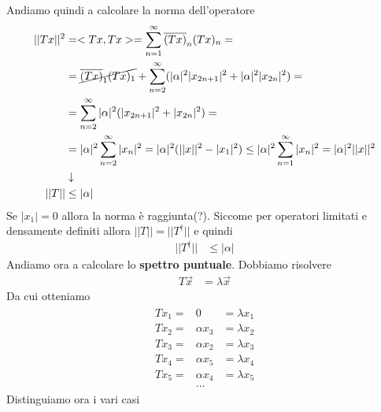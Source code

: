 Andiamo quindi a calcolare la norma dell'operatore
\begin{align}
	||Tx||^2 &= <Tx,Tx> = \sum_{n=1}^{\infty} \overline{(Tx)}_n (Tx)_n = \nonumber\\
	&=\cancel{\overline{(Tx)}_1 (Tx)_1} + \sum_{n=2}^{\infty} (|\alpha|^2 |x_{2n+1}|^2 + |\alpha|^2 |x_{2n}|^2) = \nonumber\\
	&=\sum_{n=2}^{\infty} |\alpha|^2( |x_{2n+1}|^2 + |x_{2n}|^2) = \nonumber\\
	&=|\alpha|^2 \sum_{n=2}^{\infty} |x_{n}|^2 =|\alpha|^2( ||x||^2 - |x_1|^2) \leq |\alpha|^2 \sum_{n=1}^{\infty} |x_{n}|^2 = |\alpha|^2 ||x||^2 \\ &\downarrow \nonumber \\
	||T|| &\leq |\alpha|	
\end{align}
Se $|x_1|=0$ allora la norma è raggiunta(?).
Siccome per operatori limitati e densamente definiti allora $||T|| = ||T^\dagger||$ e quindi 
\begin{align}
	||T^\dagger|| &\leq |\alpha|	
\end{align}
Andiamo ora a calcolare lo \textbf{spettro puntuale}. Dobbiamo risolvere
\begin{align}
	T\vec{x} &= \lambda \vec{x}	
\end{align}
Da cui otteniamo
\begin{align}
	\begin{matrix}
		Tx_1 =& 0 &= \lambda x_1 \\
		Tx_2 =& \alpha x_3 &= \lambda x_2\\
		Tx_3 =& \alpha x_2 &= \lambda x_3\\
		Tx_4 =& \alpha x_5 &= \lambda x_4\\
		Tx_5 =& \alpha x_4 &= \lambda x_5\\
		&\dots
	\end{matrix} 
\end{align}
\newpage
Distinguiamo ora i vari casi
